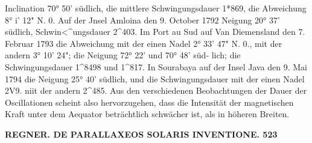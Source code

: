 \documentclass[12pt,a4paper]{article}
\begin{document}
 Inclination  70°  50'  südlich,  die  mittlere  Schwingungsdauer  1*869, die  Abweichung  8°  i'  12"  N.  0.  Auf  der  Jnsel  Amloina  den  9.  October  1792  Neigung  20°  37'  südlich, Schwin<\textasciicircum{}ungsdauer  2\textasciicircum{}403.  Im  Port  au  Sud  auf  Van  Diemensland  den  7.  Februar  1793  die  Abweichung mit  der  einen  Nadel  2°  33'  47"  N.  0.,  mit  der  andern  3°  10'  24";  die  Neigung  72°  22'  und  70°  48'  süd- lich; die  Schwingungsdauer  1\textasciicircum{}8498  und  1\textasciicircum{}817.  In  Sourabaya  auf  der  Insel  Java  den  9.  Mai  1794  die Neigung  25°  40'  südlich,  und  die  Schwingungsdauer  mit  der  einen  Nadel  2V9.  niit  der  andern  2\textasciicircum{}485. Aus  den  verschiedenen  Beobachtungen  der  Dauer  der  Oscillationen  scheint  also  hervorzugehen,  dass die  Intensität  der  magnetischen  Kraft  unter  dem  Aequator  beträchtlich  schwächer  ist,  als  in  höheren Breiten.

\vspace{0.5em}


\noindent\textbf{REGNER.     DE  PARALLAXEOS  SOLARIS  INVENTIONE.  523}
\end{document}
